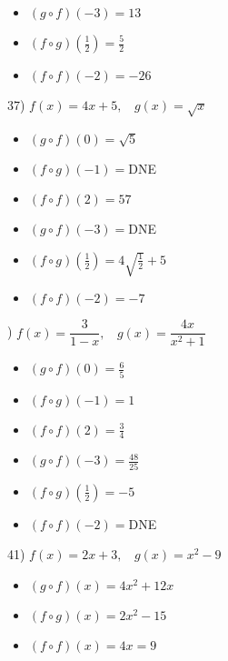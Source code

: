 \documentclass[11pt]{book}
\theoremstyle{definition}  %
\begin{document}
\begin{multicols}{3}
\begin{itemize}
\item  $(g\circ f)(-3)=13$
\item  $(f\circ g)(\frac{1}{2})=\frac{5}{2}$
\item  $(f\circ f)(-2)=-26$
\end{itemize}
\end{multicols}
\normalsize

37) $f(x)=4x+5,~~~~g(x)=\sqrt{x}$
\scriptsize
\begin{multicols}{3}
\begin{itemize}
\item  $(g\circ f)(0)=\sqrt{5}$
\item  $(f\circ g)(-1)=$DNE
\item  $(f\circ f)(2)=57$
\end{itemize}
\end{multicols}

\begin{multicols}{3}
\begin{itemize}
\item  $(g\circ f)(-3)=$DNE
\item  $(f\circ g)(\frac{1}{2})=4\sqrt{\frac{1}{2}}+5$
\item  $(f\circ f)(-2)=-7$
\end{itemize}
\end{multicols}
\normalsize

) $f(x)=\dfrac{3}{1-x},~~~~g(x)=\dfrac{4x}{x^2+1}$
\scriptsize
\begin{multicols}{3}
\begin{itemize}
\item  $(g\circ f)(0)=\frac{6}{5}$
\item  $(f\circ g)(-1)=1$
\item  $(f\circ f)(2)=\frac{3}{4}$
\end{itemize}
\end{multicols}

\begin{multicols}{3}
\begin{itemize}
\item  $(g\circ f)(-3)=\frac{48}{25}$
\item  $(f\circ g)(\frac{1}{2})=-5$
\item  $(f\circ f)(-2)=$DNE
\end{itemize}
\end{multicols}
\normalsize

41) $f(x)=2x+3,~~~~g(x)=x^2-9$
\scriptsize
\begin{multicols}{3}
\begin{itemize}
\item  $(g\circ f)(x)=4x^2+12x$
\item  $(f\circ g)(x)=2x^2-15$
\item  $(f\circ f)(x)=4x=9$
\end{itemize}
\end{multicols}
\normalsize
\end{document}

